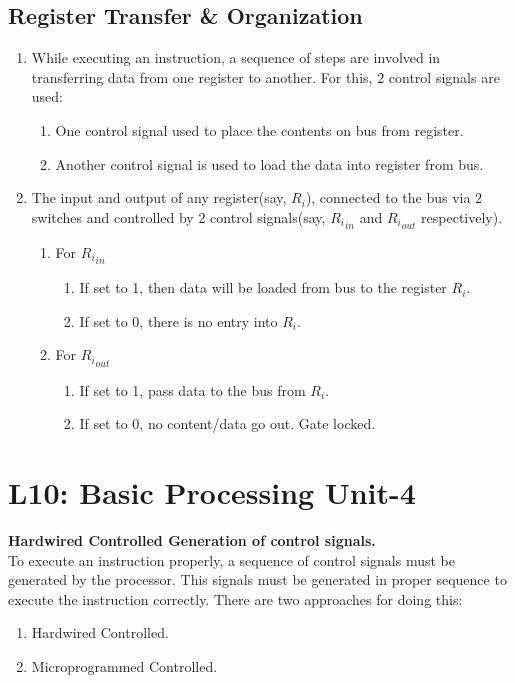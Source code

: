 \documentclass[12 pt, letterpaper]{extarticle}
\begin{document}
\subsection*{Register Transfer \& Organization}
\begin{enumerate}
	\item While executing an instruction, a sequence of steps are involved in transferring data from one register to another. For this, $2$ control signals are used:
	      \begin{enumerate}
		      \item One control signal used to place the contents on bus from register.
		      \item Another control signal is used to load the data into register from bus.
	      \end{enumerate}
	\item The input and output of any register(say, $R_i$), connected to the bus via $2$ switches and controlled by 2 control signals(say, ${R_i}_{in}$ and ${R_i}_{out}$ respectively).
	      \begin{enumerate}
		      \item For ${R_i}_{in}$
		            \begin{enumerate}
			            \item If set to 1, then data will be loaded from bus to the register $R_i$.
			            \item If set to 0, there is no entry into $R_i$.
		            \end{enumerate}
		      \item For ${R_i}_{out}$
		            \begin{enumerate}
			            \item If set to 1, pass data to the bus from $R_i$.
			            \item If set to 0, no content/data go out. Gate locked.
		            \end{enumerate}
	      \end{enumerate}
\end{enumerate}

\section*{L10: Basic Processing Unit-4}
\textbf{Hardwired Controlled Generation of control signals.}\\
To execute an instruction properly, a sequence of control signals must be generated by the processor.
This signals must be generated in proper sequence to execute the instruction correctly.
There are two approaches for doing this:
\begin{enumerate}
	\item Hardwired Controlled.
	\item Microprogrammed Controlled.
\end{enumerate}
\end{document}
